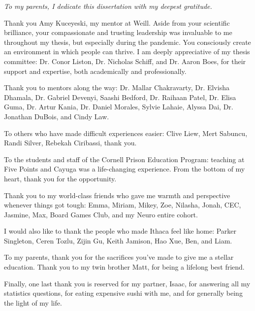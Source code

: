 \documentclass[phd,tocprelim]{cornell}
\begin{document}
\begin{dedication}
\textit{To my parents, I dedicate this dissertation with my deepest gratitude. }

\end{dedication}

\begin{acknowledgements}
Thank you Amy Kuceyeski, my mentor at Weill. Aside from your scientific brilliance, your compassionate and trusting leadership was invaluable to me throughout my thesis, but especially during the pandemic.  You consciously create an environment in which people can  thrive. I am deeply appreciative of my thesis committee: Dr. Conor Liston, Dr. Nicholas Schiff, and Dr. Aaron Boes, for their support and expertise, both academically and professionally.

Thank you to mentors along the way: Dr. Mallar Chakravarty, Dr. Elvisha Dhamala, Dr. Gabriel Devenyi, Saashi Bedford, Dr. Raihaan Patel,  Dr. Elisa Guma, Dr. Artur Kania,  Dr. Daniel Morales, Sylvie Lahaie, Alyssa Dai,  Dr. Jonathan DuBois,  and Cindy Law.

To others who have made difficult experiences easier: Clive Liew, Mert Sabuncu, Randi Silver, Rebekah Ciribassi, thank you.

To the students and staff of the Cornell Prison Education Program: teaching at Five Points and Cayuga was a life-changing experience. From the bottom of my heart, thank you for the opportunity.

Thank you to my world-class friends who gave me warmth and perspective whenever things got tough: Emma, Miriam, Mikey, Zoe, Nilasha, Jonah, CEC, Jasmine, Max, Board Games Club, and my Neuro entire cohort.

I would also like to thank the people who made Ithaca feel like home:  Parker Singleton, Ceren Tozlu, Zijin Gu, Keith Jamison,  Hao Xue, Ben, and Liam.

To my parents, thank you for the sacrifices you’ve made to
give me a stellar education. Thank you to my twin brother Matt, for being a lifelong best friend.

Finally, one last thank you is reserved for my partner, Isaac,  for answering all my statistics questions, for eating expensive sushi with me, and for generally being the light of my life.
\end{acknowledgements}

\contentspage
\tablelistpage
\figurelistpage

\normalspacing \setcounter{page}{1} 
\pagestyle{cornell} \addtolength{\parskip}{0.5\baselineskip}
\end{document}
